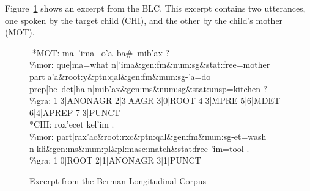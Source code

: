 

Figure~\ref{fig:excerpt} shows an excerpt from the BLC. This excerpt contains
two utterances, one spoken by the target child (CHI), and the other
by the child's mother (MOT).
\begin{figure}[ht]
\vspace{10pt}
\label{fig:excerpt}
\caption{Excerpt from the Berman Longitudinal Corpus}
\vspace{-12pt}\begin{tabbing}
\small
\hspace{0.6in} \= \hspace{5.5in} \kill
\textsf{*MOT:} \> \textsf{ma\, \a'{i}ma \,
o\a'{a}\, ba\#\, mib\a'{a}x ?} \\
\textsf{\%mor:} \> \textsf{que|ma=what n|\a'{i}ma\&gen:fm\&num:sg\&stat:free=mother} \\
 \> \textsf{part|a\a'{a}\&root:y\&ptn:qal\&gen:fm\&num:sg-\a'{a}=do} \\
   \> \textsf{prep|be~det|ha n|mib\a'{a}x\&gen:ms\&num:sg\&stat:unsp=kitchen ?}\\
\textsf{\%gra:} \>	\textsf{1|3|ANONAGR 2|3|AAGR 3|0|ROOT 4|3|MPRE 5|6|MDET 6|4|APREP 7|3|PUNCT}\\
\textsf{*CHI:} \> \textsf{rox\a'{e}cet kel\a'{i}m .}\\
\textsf{\%mor:} \> \textsf{part|rax\a'{a}c\&root:rxc\&ptn:qal\&gen:fm\&num:sg-et=wash} \\
    \>  \textsf{n|kli}\&\textsf{gen:ms\&num:pl\&pl:masc:match\&stat:free-\a'{i}m=tool .} \\ 
\textsf{\%gra:} \> \textsf{1|0|ROOT 2|1|ANONAGR 3|1|PUNCT}
\end{tabbing}
\end{figure}

